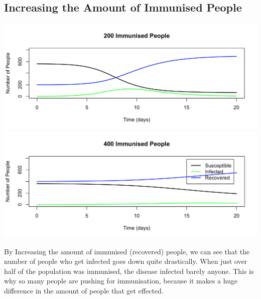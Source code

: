 \documentclass{article}
\begin{document}
    \subsection{Increasing the Amount of Immunised People}
        \includegraphics[width=\textwidth,height=\textheight,keepaspectratio]{sir_immunised_200.png}
        \includegraphics[width=\textwidth,height=\textheight,keepaspectratio]{sir_immunised_400.png}

        By Increasing the amount of immunised (recovered) people, we can see that the number of people who get infected goes down quite drastically. When just over half of the population was immunised, the disease infected barely anyone. This is why so many people are pushing for immunisation, because it makes a huge difference in the amount of people that get effected.
\end{document}
